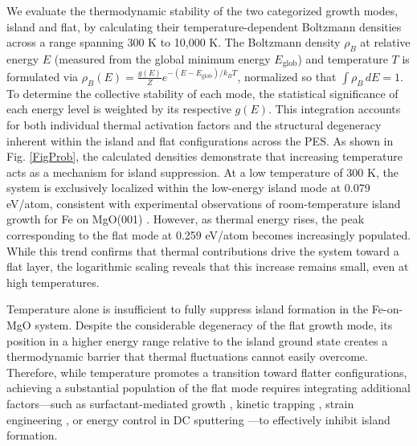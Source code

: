 We evaluate the thermodynamic stability of the two categorized growth modes, island and flat, by calculating their temperature-dependent Boltzmann densities across a range spanning 300 K to 10,000 K. The Boltzmann density $\rho_B$ at relative energy $E$ (measured from the global minimum energy $E_{\text{glob}}$) and temperature $T$ is formulated via $\rho_B(E) = \frac{g(E)}{Z} e^{-(E - E_{\text{glob}}) / k_B T}$, normalized so that $\int \rho_B \, dE = 1$. To determine the collective stability of each mode, the statistical significance of each energy level is weighted by its respective $g(E)$. This integration accounts for both individual thermal activation factors and the structural degeneracy inherent within the island and flat configurations across the PES. As shown in Fig. \ref{FigProb}, the calculated densities demonstrate that increasing temperature acts as a mechanism for island suppression. At a low temperature of 300 K, the system is exclusively localized within the low-energy island mode at 0.079 eV/atom, consistent with experimental observations of room-temperature island growth for Fe on MgO(001) \cite{reitinger2007}. However, as thermal energy rises, the peak corresponding to the flat mode at 0.259 eV/atom becomes increasingly populated. While this trend confirms that thermal contributions drive the system toward a flat layer, the logarithmic scaling reveals that this increase remains small, even at high temperatures.

Temperature alone is insufficient to fully suppress island formation in the Fe-on-MgO system. Despite the considerable degeneracy of the flat growth mode, its position in a higher energy range relative to the island ground state creates a thermodynamic barrier that thermal fluctuations cannot easily overcome. Therefore, while temperature promotes a transition toward flatter configurations, achieving a substantial population of the flat mode requires integrating additional factors—such as surfactant-mediated growth \cite{paisley2011}, kinetic trapping \cite{chambers2010}, strain engineering \cite{tersoff1994}, or energy control in DC sputtering \cite{Reck2024}—to effectively inhibit island formation.
